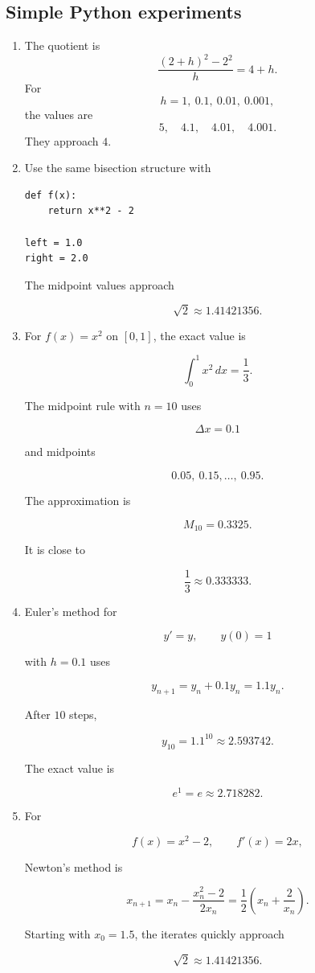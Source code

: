 \subsection*{Simple Python experiments}

\begin{enumerate}
\item
The quotient is
\[
\frac{(2+h)^2-2^2}{h}=4+h.
\]
For
\[
h=1,\ 0.1,\ 0.01,\ 0.001,
\]
the values are
\[
5,\quad 4.1,\quad 4.01,\quad 4.001.
\]
They approach \(4\).

\item
Use the same bisection structure with

\begin{verbatim}
def f(x):
    return x**2 - 2

left = 1.0
right = 2.0
\end{verbatim}

The midpoint values approach

\[
\sqrt2\approx1.41421356.
\]

\item
For \(f(x)=x^2\) on \([0,1]\), the exact value is

\[
\int_0^1 x^2\,dx=\frac13.
\]

The midpoint rule with \(n=10\) uses

\[
\Delta x=0.1
\]

and midpoints

\[
0.05,\ 0.15,\ldots,\ 0.95.
\]

The approximation is

\[
M_{10}=0.3325.
\]

It is close to

\[
\frac13\approx0.333333.
\]

\item
Euler's method for

\[
y'=y,\qquad y(0)=1
\]

with \(h=0.1\) uses

\[
y_{n+1}=y_n+0.1y_n=1.1y_n.
\]

After \(10\) steps,

\[
y_{10}=1.1^{10}\approx2.593742.
\]

The exact value is

\[
e^1=e\approx2.718282.
\]

\item
For

\[
f(x)=x^2-2,
\qquad
f'(x)=2x,
\]

Newton's method is

\[
x_{n+1}
=
x_n-\frac{x_n^2-2}{2x_n}
=
\frac12\left(x_n+\frac2{x_n}\right).
\]

Starting with \(x_0=1.5\), the iterates quickly approach

\[
\sqrt2\approx1.41421356.
\]
\end{enumerate}

